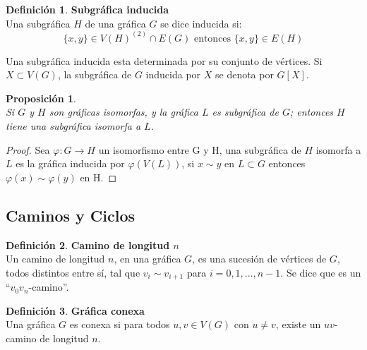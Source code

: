 \documentclass[11pt]{book}
\newtheorem{proposition}{Proposición}
\theoremstyle{definition}
\newtheorem{definition}{Definición}
\begin{document}
\begin{definition}\textbf{Subgráfica inducida}\\
  Una subgráfica $H$ de una gráfica $G$ se dice inducida si:
\begin{equation*}
\{x,y\}\in
  V(H)^{(2)}\cap E(G) \text{ entonces } \{x,y\}\in E(H)
\end{equation*}
\end{definition}

Una subgráfica inducida esta determinada por su conjunto de
vértices. Si $X\subset V(G)$, la subgráfica de $G$ inducida por $X$ se
denota por $G[X]$.

\begin{proposition}\textbf{}\\
  Si $G$ y $H$ son gráficas isomorfas, y la gráfica $L$ es subgráfica
  de $G$; entonces $H$ tiene una subgráfica isomorfa a $L$.
\end{proposition}

\begin{proof}
 Sea $\varphi : G \rightarrow H$ un isomorfismo entre G y
H, una subgráfica de $H$ isomorfa a $L$ es la gráfica inducida por
$\varphi (V(L))$, si $x\sim y$ en $L\subset G$ entonces $\varphi
(x)\sim \varphi (y)$ en H.
\end{proof}

\subsection{Caminos y Ciclos}



\begin{definition}\textbf{Camino de longitud $n$}\\
  Un camino de longitud $n$, en una gráfica $G$, es una sucesión de vértices de
  $G$, todos distintos entre sí, tal que $v_i\sim v_{i+1}$ para
  $i=0,1,...,n-1$. Se dice que es un
  ``$v_0v_n$-camino''.

\end{definition}


\begin{definition}\textbf{Gráfica conexa}\\
  Una gráfica $G$ es conexa si para todos $ u,v\in V(G)$ con $u\neq
  v$, existe un $uv$-camino de longitud $n$.
\end{definition}
\end{document}
